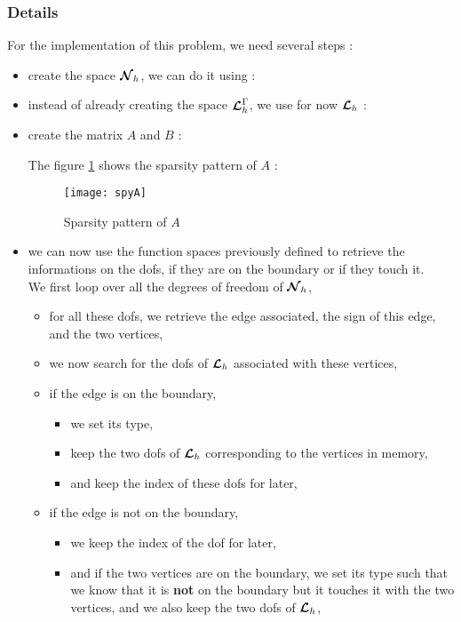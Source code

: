\subsubsection{Details}

For the implementation of this problem, we need several steps :
\begin{itemize}
\item create the space ${\bm{\mathcal{N}}}_h$, we can do it using :

\item instead of already creating the space ${\bm{\mathcal{L}}}_h^\Gamma$, we use for now ${\bm{\mathcal{L}}}_h$ :

\item create the matrix $A$ and $B$ :

The figure \ref{spyA} shows the sparsity pattern of $A$ : 
\begin{figure}[H]
\centering
\texttt{[image: spyA]}
\caption{Sparsity pattern of $A$}
\label{spyA}
\end{figure}
\item we can now use the function spaces previously defined to retrieve the
  informations on the dofs, if they are on the boundary or if they touch it.\\
We first loop over all the degrees of freedom of ${\bm{\mathcal{N}}}_h$,
\begin{itemize}
\item for all these dofs, we retrieve the edge associated, the sign of this
  edge, and the two vertices,
\item we now search for the dofs of ${\bm{\mathcal{L}}}_h$ associated with these vertices,
\item if the edge is on the boundary,
\begin{itemize}
\item we set its type,
\item keep the two dofs of ${\bm{\mathcal{L}}}_h$ corresponding to the vertices in memory,
\item  and keep the index of these dofs for later,
\end{itemize}
\item if the edge is not on the boundary,
\begin{itemize}
\item we keep the index of the dof for later,
\item and if the two vertices are on the boundary, we set its type such that we
  know that it is {\bf not} on the boundary but it touches it with the two
  vertices, and we also keep the two dofs of ${\bm{\mathcal{L}}}_h$,

\end{itemize}
\end{itemize}
\end{itemize}
